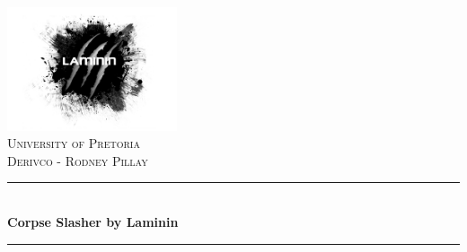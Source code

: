 \documentclass[letterpaper]{article}
\author{%
    Nico Taljaard \\
    10153285 \\%
    Gerhard Smit \\
    12282945 \\%
    Martin Schoeman \\
    10651994 \\
}
\begin{document}
\begin{titlepage}

\newcommand{\HRule}{\rule{\linewidth}{0.5mm}} %

\begin{center} %
 

\includegraphics[width=50mm]{laminin.png} \\
\textsc{\Large University of Pretoria}\\[0.2cm] %
\textsc{\large Derivco - Rodney Pillay}\\[0.2cm] %


\HRule \\[0.4cm]
{ \huge \bfseries Corpse Slasher by Laminin}\\[0.4cm] %
\HRule \\[0.5cm]
 


\end{center}
\end{titlepage}
\end{document}

